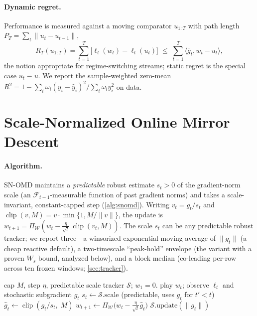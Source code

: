 \documentclass{article}
\newcommand{\ip}[2]{\langle #1, #2 \rangle}
\newcommand{\norm}[1]{\lVert #1 \rVert}
\newcommand{\gt}{g_t}
\newcommand{\clip}{\operatorname{clip}}
\begin{document}
\paragraph{Dynamic regret.} Performance is measured against a moving comparator
$u_{1:T}$ with path length $P_T=\sum_{t}\norm{u_t-u_{t-1}}$,
\begin{equation}
\label{eq:dynreg}
R_T(u_{1:T})=\sum_{t=1}^T\bigl[\ell_t(w_t)-\ell_t(u_t)\bigr]
\;\le\;\sum_{t=1}^T\ip{\bar g_t}{w_t-u_t},
\end{equation}
the notion appropriate for regime-switching streams; static regret is the special
case $u_t\equiv u$. We report the sample-weighted zero-mean $R^2=
1-\sum_i\omega_i(y_i-\hat y_i)^2/\sum_i\omega_i y_i^2$ on data.

\section{Scale-Normalized Online Mirror Descent}
\label{sec:method}

\paragraph{Algorithm.} SN-OMD maintains a \emph{predictable} robust estimate $s_t>0$
of the gradient-norm scale (an $\mathcal F_{t-1}$-measurable function of past gradient
norms) and takes a scale-invariant, constant-capped step
(\cref{alg:snomd}). Writing $v_t=\gt/s_t$ and
$\clip(v,M)=v\cdot\min\{1,M/\norm v\}$, the update is
$w_{t+1}=\Pi_{\mathcal W}(w_t-\tfrac{\eta}{\sqrt t}\,\clip(v_t,M))$. The scale $s_t$
can be any predictable robust tracker; we report three---a winsorized exponential moving
average of $\norm{\gt}$ (a cheap reactive default), a two-timescale ``peak-hold'' envelope
(the variant with a proven $W_s$ bound, analyzed below), and a block median (co-leading
per-row across ten frozen windows; \cref{sec:tracker}).

\begin{algorithm}[t]
  \caption{Scale-Normalized OMD (SN-OMD)}
  \label{alg:snomd}
  \begin{algorithmic}
     cap $M$, step $\eta$, predictable scale tracker
    $\mathcal S$; $w_1=0$.
    \STATE play $w_t$; observe $\ell_t$ and stochastic subgradient $\gt$
    \STATE $s_t \leftarrow \mathcal S.\mathrm{scale}$ \hfill (predictable, uses
    $\gt$ for $t'<t$)
    \STATE $\hat g_t \leftarrow \clip(\gt/s_t,\;M)$
    \STATE $w_{t+1}\leftarrow \Pi_{\mathcal W}\bigl(w_t-\tfrac{\eta}{\sqrt t}\hat g_t\bigr)$
    \STATE $\mathcal S.\mathrm{update}(\norm{\gt})$
    \ENDFOR
  \end{algorithmic}
\end{algorithm}
\end{document}
